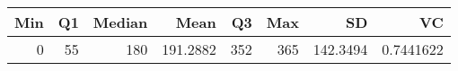 
\begin{tabular}[t]{rrrrrrrr}
\toprule
Min & Q1 & Median & Mean & Q3 & Max & SD & VC\\
\midrule
0 & 55 & 180 & 191.2882 & 352 & 365 & 142.3494 & 0.7441622\\
\bottomrule
\end{tabular}